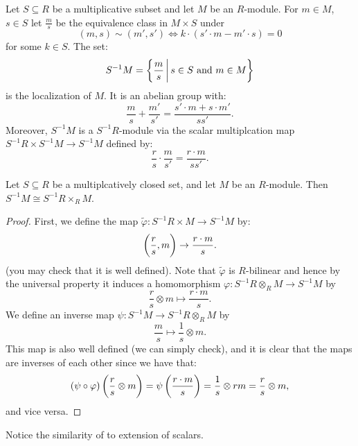 \documentclass[11pt,a4paper]{article}
\begin{document}
\begin{definition}
  Let $S \subseteq R$ be a multiplicative subset and let $M$ be an $R$-module.
  For $m \in M$, $s \in S$ let $\frac{m}{s}$ be the equivalence class
  in $M \times S$ under
  \[
    (m,s) \sim (m',s') \iff
    k \cdot (s' \cdot m - m' \cdot s) = 0
  \]
  for some $k \in S$.
  The set:
  \[
    S^{-1} M =
    \left\{\frac{m}{s} \,\middle\vert\, s \in S \text{ and } m \in M\right\}
  \]
  is the localization of $M$.
  It is an abelian group with:
  \[
    \frac{m}{s} +
    \frac{m'}{s'} =
    \frac{s' \cdot m + s \cdot m'}{ss'}.
  \]
  Moreover, $S^{-1}M$ is a $S^{-1}R$-module via
  the scalar multiplcation map $S^{-1}R \times S^{-1}M \to S^{-1}M$
  defined by:
  \[
    \frac{r}{s} \cdot
    \frac{m}{s'} =
    \frac{r \cdot m}{ss'}.
  \]
\end{definition}

\begin{lemma}
  \label{lem:extension-of-modules}
  Let $S \subseteq R$ be a multiplcatively closed set,
  and let $M$ be an $R$-module.
  Then $S^{-1}M \cong S^{-1}R \times_{R} M$.
\end{lemma}
\begin{proof}
  First, we define the map
  $\tilde \varphi \colon S^{-1}R \times M \to S^{-1}M$
  by:
  \[
    \del{\frac{r}{s},m} \to \frac{r \cdot m}{s}.
  \]
  (you may check that it is well defined).
  Note that $\tilde \varphi$ is $R$-bilinear and hence by the universal
  property it induces a homomorphism
  $\varphi \colon S^{-1}R \otimes_{R} M \to S^{-1}M$ by
  \[
    \frac{r}{s} \otimes m \mapsto \frac{r \cdot m}{s}.
  \]
  We define an inverse map $\psi \colon S^{-1}M \to S^{-1}R \otimes_{R} M$
  by
  \[
    \frac{m}{s} \mapsto \frac{1}{s} \otimes m.
  \]
  This map is also well defined (we can simply check),
  and it is clear that the maps
  are inverses of each other since we have that:
  \[
    (\psi \circ \varphi)\del{\frac{r}{s} \otimes m} =
    \psi\del{\frac{r \cdot m}{s}} =
    \frac{1}{s} \otimes r m =
    \frac{r}{s} \otimes m,
  \]
  and vice versa.
\end{proof}

\begin{remark}
  Notice the similarity of  to
  extension of scalars.
\end{remark}

%
%
\end{document}
